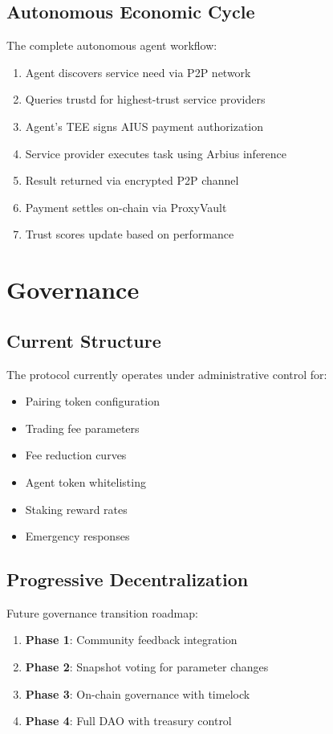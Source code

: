 \documentclass{article}
\begin{document}
\subsection{Autonomous Economic Cycle}

The complete autonomous agent workflow:

\begin{enumerate}
    \item Agent discovers service need via P2P network
    \item Queries trustd for highest-trust service providers
    \item Agent's TEE signs AIUS payment authorization
    \item Service provider executes task using Arbius inference
    \item Result returned via encrypted P2P channel
    \item Payment settles on-chain via ProxyVault
    \item Trust scores update based on performance
\end{enumerate}

\section{Governance}

\subsection{Current Structure}

The protocol currently operates under administrative control for:
\begin{itemize}
    \item Pairing token configuration
    \item Trading fee parameters
    \item Fee reduction curves
    \item Agent token whitelisting
    \item Staking reward rates
    \item Emergency responses
\end{itemize}

\subsection{Progressive Decentralization}

Future governance transition roadmap:

\begin{enumerate}
    \item \textbf{Phase 1}: Community feedback integration
    \item \textbf{Phase 2}: Snapshot voting for parameter changes
    \item \textbf{Phase 3}: On-chain governance with timelock
    \item \textbf{Phase 4}: Full DAO with treasury control
\end{enumerate}
\end{document}

